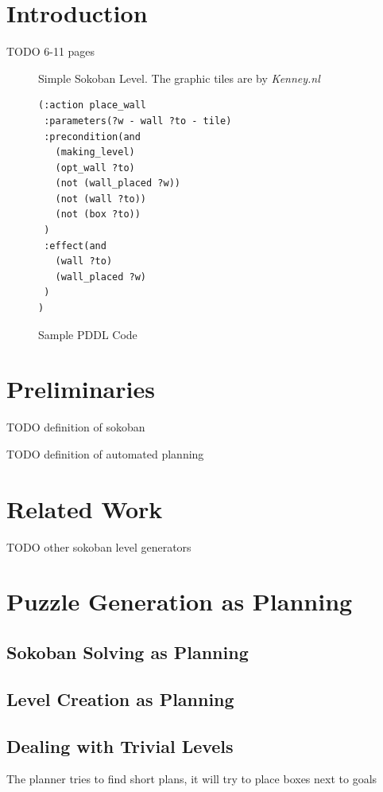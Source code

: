 \documentclass[runningheads]{llncs}
\begin{document}
\section{Introduction}

TODO 6-11 pages

\begin{figure}
\centering
\w\w\w\w\w\w\n
\w\p\e\x\g\w\n
\w\w\w\w\w\w\n
\caption{Simple Sokoban Level. The graphic tiles are by \emph{Kenney.nl}}
\end{figure}

\begin{figure}
\centering
\begin{verbatim}
(:action place_wall
 :parameters(?w - wall ?to - tile)
 :precondition(and
   (making_level)
   (opt_wall ?to)
   (not (wall_placed ?w))
   (not (wall ?to))
   (not (box ?to))
 )
 :effect(and
   (wall ?to)
   (wall_placed ?w)
 )
)

\end{verbatim}
\caption{Sample PDDL Code}
\end{figure}



\section{Preliminaries}
TODO definition of sokoban

TODO definition of automated planning

\section{Related Work}
TODO other sokoban level generators

\section{Puzzle Generation as Planning}

\subsection{Sokoban Solving as Planning}

\subsection{Level Creation as Planning}

\subsection{Dealing with Trivial Levels}
The planner tries to find short plans, it will try to place boxes next to goals
\end{document}
